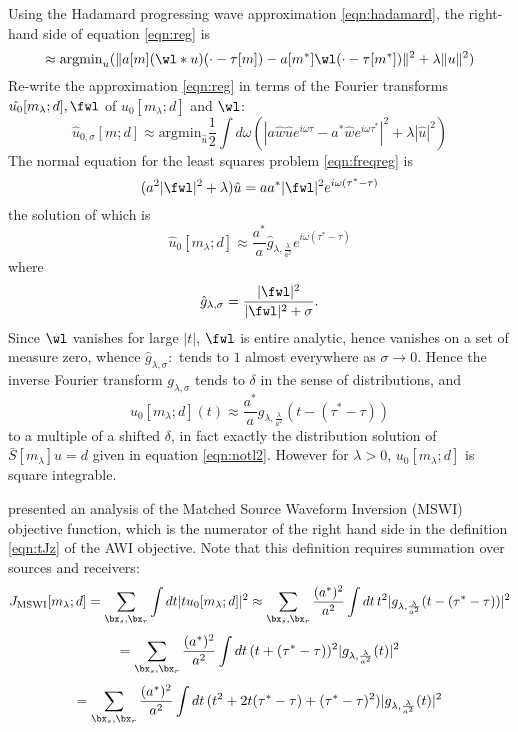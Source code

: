 Using the Hadamard progressing wave approximation \ref{eqn:hadamard},
the right-hand side of equation \ref{eqn:reg} is 
$$
\approx \mbox{argmin}_u (\|a[m](\wl*u)(\cdot-\tau[m])-a[m^*]\wl(\cdot-\tau[m^*])\|^2 + \lambda\|u\|^2)
$$
Re-write the approximation \ref{eqn:reg} in terms of the Fourier transforms $\hat{u_0}[m_{\lambda};d],\fwl$ of $u_0[m_{\lambda};d]$ and $\wl$:
\begin{equation}
  \label{eqn:freqreg}
\hat{u}_{0,\sigma}[m;d] \approx \mbox{argmin}_{\hat{u}}\frac{1}{2}\int d\omega \left(|a\hat{w}\hat{u}e^{i\omega \tau}-a^*\hat{w}e^{i\omega\tau^*}|^2 + \lambda |\hat{u}|^2\right)
\end{equation}
The normal equation for the least squares problem \ref{eqn:freqreg} is
\[
(a^2 |\fwl|^2 +\lambda)\hat{u} = a a^*|\fwl|^2e^{i\omega(\tau^*-\tau)}
\]
the solution of which is
\begin{equation}
  \label{eqn:hatuf}
\hat{u}_0[m_{\lambda};d] \approx \frac{a^*}{a}\hat{g}_{\lambda,\frac{\lambda}{a^2}} e^{i\omega(\tau^*-\tau)}
\end{equation}
where
\begin{equation}
  \label{eqn:hatgf}
\hat{g}_{\lambda,\sigma} = \frac{|\fwl|^2}{|\fwl|^2 + \sigma}.
\end{equation}
Since $\wl$ vanishes for large $|t|$, $\fwl$ is entire analytic,
hence vanishes on a set of measure zero, whence $\hat{g}_{\lambda,\sigma}:$ tends to $1$ almost everywhere as $\sigma \rightarrow 0$. Hence the inverse Fourier transform $g_{\lambda,\sigma}$ tends to $\delta$ in the sense of distributions, and 
$$
u_0[m_{\lambda};d](t) \approx \frac{a^*}{a}g_{\lambda,\frac{\lambda}{a^2}}(t-(\tau^*-\tau))
$$
to a multiple of a shifted $\delta$, in fact exactly the distribution
solution of $\bar{S}[m_{\lambda}]u=d$ given in equation \ref{eqn:notl2}. However for $\lambda>0$, $u_0[m_{\lambda};d]$ is square integrable.

\cite{HuangSymes2015SEG} presented an analysis of the Matched Source
Waveform Inversion (MSWI) objective function, which is the numerator
of the right hand side in the definition \ref{eqn:tJz} of the AWI
objective. Note that this definition requires summation over sources and receivers:
\[
J_{\rm MSWI}[m_{\lambda};d] = \sum_{\bx_s,\bx_r}\int dt |tu_0[m_{\lambda};d]|^2 \approx \sum_{\bx_s,\bx_r}\frac{(a^*)^2}{a^2} \int dt\, t^2|g_{\lambda,\frac{\lambda}{a^2}}(t-(\tau^*-\tau))|^2
\]
\[
=\sum_{\bx_s,\bx_r}\frac{(a^*)^2}{a^2} \int dt\, (t+(\tau^*-\tau))^2|g_{\lambda,\frac{\lambda}{a^2}}(t)|^2
\]
\begin{equation}
  \label{eqn:MSWI}
  =\sum_{\bx_s,\bx_r}\frac{(a^*)^2}{a^2} \int dt\, (t^2 + 2t
  (\tau^*-\tau)+(\tau^*-\tau)^2)|g_{\lambda,\frac{\lambda}{a^2}}(t)|^2
\end{equation}

